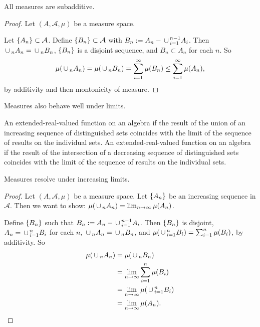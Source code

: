 \begin{prop}
  All measures are subadditive.
  \begin{proof}
    Let $(A, \mathcal{A}, \mu)$ be a measure space.

    Let $\{A_n\} \subset \mathcal{A}$.
    Define $\{B_n\} \subset \mathcal{A}$
    with $B_n := A_n - \,\cup\,_{i = 1}^{n-1} A_i$.
    Then
    $\,\cup\,_n A_n = \,\cup\,_n B_n$,
    $\{B_n\}$ is a disjoint sequence, and
    $B_n \subset A_n$ for each $n$.
    So
    \[
      \mu(\,\cup\,_{n} A_n) = \mu(\,\cup\,_{n} B_n) = \sum_{i = 1}^{\infty} \mu(B_n) \leq \sum_{i = 1}^{\infty} \mu(A_n),
    \]
    by additivity and then montonicity of measure.
  \end{proof}

\end{prop}

Measures also behave well under limits.

An extended-real-valued function on an algebra
if the result of the union of an increasing sequence
of distinguished sets coincides with the
limit of the sequence of results on the individual
sets.
An extended-real-valued function on an algebra
if the result of the intersection of a decreasing sequence
of distinguished sets coincides with the
limit of the sequence of results on the individual
sets.


\begin{prop}
  Measures resolve under increasing limits.
  \begin{proof}
    Let $(A, \mathcal{A}, \mu)$ be
    a measure space.
    Let $\{A_n\}$
    be an increasing sequence in $\mathcal{A}$.
    Then we want to show:
    $\mu(\,\cup\,_{n} A_n) = \lim_{n \to \infty} \mu(A_n)$.

    Define $\{B_n\}$ such that
    $B_n := A_n - \,\cup\,_{i = 1}^{n-1} A_i$.
    Then
    $\{B_n\}$ is disjoint,
    $A_n = \,\cup\,_{i = 1}^{n} B_i$ for
    each $n$,
    $\,\cup\,_n A_n = \,\cup\,_n B_n$, and
    $\mu(\,\cup\,_{i = 1}^{n} B_i)
    = \sum_{i = 1}^{n} \mu(B_i)$,
    by additivity.
    So
    \[
      \begin{aligned}
        \mu(\,\cup\,_n A_n)
        &= \mu(\,\cup\,_n B_n) \\
        &= \lim_{n \to \infty} \sum_{i = 1}^{n} \mu(B_i) \\
        &= \lim_{n \to \infty} \mu(\,\cup\,_{i = 1}^{n} B_i) \\
        &= \lim_{n \to \infty} \mu(A_n).
      \end{aligned}
    \]
  \end{proof}
\end{prop}

